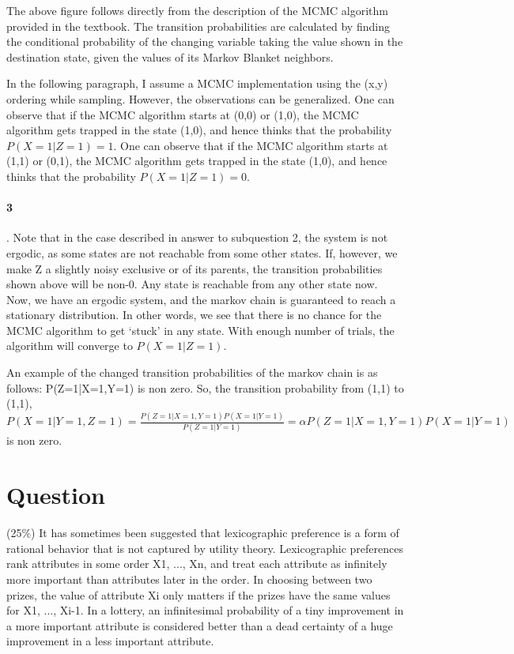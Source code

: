 \documentclass[10pt]{article}
\begin{document}
 The above figure follows directly from the description of the MCMC algorithm provided in the textbook. The transition probabilities are calculated by finding the conditional probability of the changing variable taking the value shown in the destination state, given the values of its Markov Blanket neighbors.

In the following paragraph, I assume a MCMC implementation using the (x,y) ordering while sampling. However, the observations can be generalized. One can observe that if the MCMC algorithm starts at (0,0) or (1,0), the MCMC algorithm gets trapped in the state (1,0), and hence thinks that the probability $P(X=1|Z=1)=1$. One can observe that if the MCMC algorithm starts at (1,1) or (0,1), the MCMC algorithm gets trapped in the state (1,0), and hence thinks that the probability $P(X=1|Z=1)=0$.

   \paragraph{3}. Note that in the case described in answer to subquestion 2, the system is not ergodic, as some states are not reachable from some other states. If, however, we make Z a slightly noisy exclusive or of its parents, the transition probabilities shown above will be non-0. Any state is reachable from any other state now.  Now, we have an ergodic system, and the markov chain is guaranteed to reach a stationary distribution. In other words, we see that there is no chance for the MCMC algorithm to get `stuck' in any state. With enough number of trials, the algorithm will converge to $P(X=1|Z=1)$.

An example of the changed transition probabilities of the markov chain is as follows: P(Z=1|X=1,Y=1) is non zero. So, the transition probability from (1,1) to (1,1), $P(X=1|Y=1,Z=1)=\frac{P(Z=1|X=1,Y=1)P(X=1|Y=1)}{P(Z=1|Y=1)}=\alpha P(Z=1|X=1,Y=1)P(X=1|Y=1)$ is non zero.

\section{Question}
 (25\%) It has sometimes been suggested that lexicographic preference is a form of rational behavior that is not captured by utility theory. Lexicographic preferences rank attributes in some order X1, ..., Xn, and treat each attribute as infinitely more important than attributes later in the order. In choosing between two prizes, the value of attribute Xi only matters if the prizes have the same values for X1, ..., Xi-1. In a lottery, an infinitesimal probability of a tiny improvement in a more important attribute is considered better than a dead certainty of a huge improvement in a less important attribute.
\end{document}
